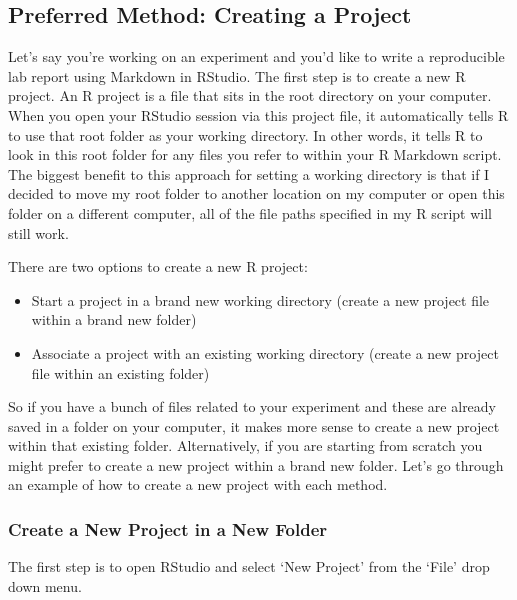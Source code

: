 \documentclass[
]{book}
\providecommand{\tightlist}{%
  \setlength{\itemsep}{0pt}\setlength{\parskip}{0pt}}
\begin{document}
\hypertarget{preferred-method-creating-a-project}{%
\subsection{Preferred Method: Creating a Project}\label{preferred-method-creating-a-project}}

Let's say you're working on an experiment and you'd like to write a reproducible lab report using Markdown in RStudio. The first step is to create a new R project. An R project is a file that sits in the root directory on your computer. When you open your RStudio session via this project file, it automatically tells R to use that root folder as your working directory. In other words, it tells R to look in this root folder for any files you refer to within your R Markdown script. The biggest benefit to this approach for setting a working directory is that if I decided to move my root folder to another location on my computer or open this folder on a different computer, all of the file paths specified in my R script will still work.

There are two options to create a new R project:

\begin{itemize}
\tightlist
\item
  Start a project in a brand new working directory (create a new project file within a brand new folder)
\item
  Associate a project with an existing working directory (create a new project file within an existing folder)
\end{itemize}

So if you have a bunch of files related to your experiment and these are already saved in a folder on your computer, it makes more sense to create a new project within that existing folder. Alternatively, if you are starting from scratch you might prefer to create a new project within a brand new folder. Let's go through an example of how to create a new project with each method.

\hypertarget{create-a-new-project-in-a-new-folder}{%
\subsubsection{Create a New Project in a New Folder}\label{create-a-new-project-in-a-new-folder}}

The first step is to open RStudio and select `New Project' from the `File' drop down menu.
\end{document}
